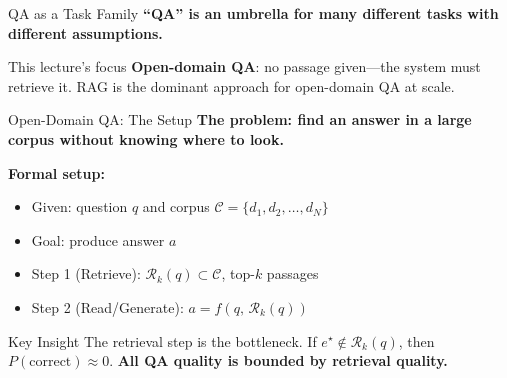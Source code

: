 \documentclass[aspectratio=169, xcolor=table]{beamer}
\begin{document}
\begin{frame}[shrink=5]{QA as a Task Family}
\textbf{``QA'' is an umbrella for many different tasks with different assumptions.}

\vspace{0.5em}
\begin{table}
\centering
{}
\end{table}

\vspace{0.4em}
\begin{block}{This lecture's focus}
\textbf{Open-domain QA}: no passage given---the system must retrieve it.
RAG is the dominant approach for open-domain QA at scale.
\end{block}
\end{frame}

\begin{frame}[shrink=20]{Open-Domain QA: The Setup}
\textbf{The problem: find an answer in a large corpus without knowing where to look.}

\vspace{0.8em}
\textbf{Formal setup:}
\begin{itemize}
  \item Given: question $q$ and corpus $\mathcal{C} = \{d_1, d_2, \ldots, d_N\}$
  \item Goal: produce answer $a$
  \item Step 1 (Retrieve): $\mathcal{R}_k(q) \subset \mathcal{C}$, top-$k$ passages
  \item Step 2 (Read/Generate): $a = f(q,\, \mathcal{R}_k(q))$
\end{itemize}


\vspace{0.5em}
\begin{block}{Key Insight}
\small
The retrieval step is the bottleneck. If $e^\star \notin \mathcal{R}_k(q)$, then $P(\text{correct}) \approx 0$.
\textbf{All QA quality is bounded by retrieval quality.}
\end{block}
\end{frame}
\end{document}
